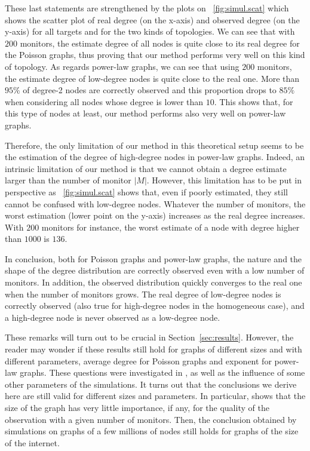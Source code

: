\documentclass[conference]{IEEEtran}
\begin{document}
These last statements are strengthened by the plots on \figurename~\ref{fig:simul.scat} which shows the scatter plot of real degree (on the x-axis) and observed degree (on the y-axis) for all targets and for the two kinds of topologies. We can see that with $200$ monitors, the estimate degree of all nodes is quite close to its real degree for the Poisson graphs, thus proving that our method performs very well on this kind of topology. As regards power-law graphs, we can see that using $200$ monitors, the estimate degree of low-degree nodes is quite close to the real one. More than $95\%$ of degree-2 nodes are correctly observed and this proportion drops to $85\%$ when considering all nodes whose degree is lower than $10$. This shows that, for this type of nodes at least, our method performs also very well on power-law graphs.

Therefore, the only limitation of our method in this theoretical setup seems to be the estimation of the degree of high-degree nodes in power-law graphs.  Indeed, an intrinsic limitation of our method is that we cannot obtain a degree estimate larger than the number of monitor $|M|$. However, this limitation has to be put in perspective as \figurename~\ref{fig:simul.scat} shows that, even if poorly estimated, they still cannot be confused with low-degree nodes. Whatever the number of monitors, the worst estimation (lower point on the y-axis) increases as the real degree increases. With $200$ monitors for instance, the worst estimate of a node with degree higher than $1000$ is $136$.

In conclusion, both for Poisson graphs and power-law graphs, the nature and the shape of the degree distribution are correctly observed even with a low number of monitors. In addition, the observed distribution quickly converges to the real one when the number of monitors grows. The real degree of low-degree nodes is correctly observed (also true for high-degree nodes in the homogeneous case), and a high-degree node is never observed as a low-degree node.

These remarks will turn out to be crucial in Section~\ref{sec:results}. However, the reader may wonder if these results still hold for graphs of different sizes and with different parameters, average degree for Poisson graphs and exponent for power-law graphs. These questions were investigated in \cite{CT01}, as well as the influence of some other parameters of the simulations. It turns out that the conclusions we derive here are still valid for different sizes and parameters. In particular, \cite{CT01} shows that the size of the graph has very little importance, if any, for the quality of the observation with a given number of monitors. Then, the conclusion obtained by simulations on graphs of a few millions of nodes still holds for graphs of the size of the internet.
\end{document}
